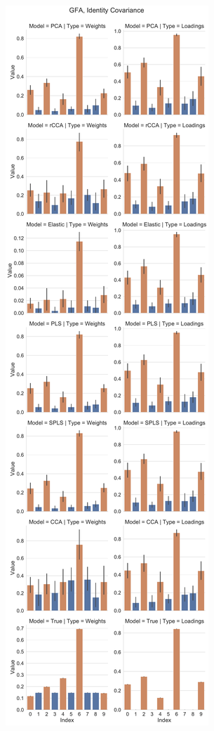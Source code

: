 \begin{figure}
    \centering
    \begin{subfigure}{0.49\linewidth}
        \centering
        \includegraphics[width=\linewidth]{figures/simulated/low/Combined_Weights_Loadings_with_Error_Bars_Identity_Covariance_explicit}

\end{subfigure}
\end{figure}
